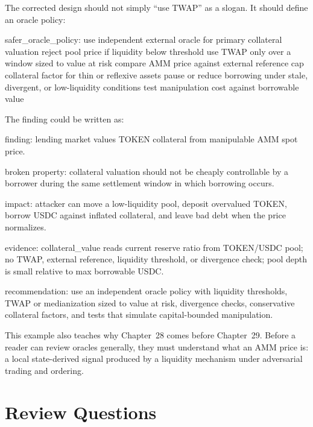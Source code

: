 The corrected design should not simply ``use TWAP'' as a slogan. It should define an oracle policy:

\begin{codeblock}
safer_oracle_policy:
    use independent external oracle for primary collateral valuation
    reject pool price if liquidity below threshold
    use TWAP only over a window sized to value at risk
    compare AMM price against external reference
    cap collateral factor for thin or reflexive assets
    pause or reduce borrowing under stale, divergent, or low-liquidity conditions
    test manipulation cost against borrowable value
\end{codeblock}

The finding could be written as:

\begin{codeblock}
finding:
    lending market values TOKEN collateral from manipulable AMM spot price.

broken property:
    collateral valuation should not be cheaply controllable by a borrower
    during the same settlement window in which borrowing occurs.

impact:
    attacker can move a low-liquidity pool, deposit overvalued TOKEN,
    borrow USDC against inflated collateral, and leave bad debt when
    the price normalizes.

evidence:
    collateral_value reads current reserve ratio from TOKEN/USDC pool;
    no TWAP, external reference, liquidity threshold, or divergence check;
    pool depth is small relative to max borrowable USDC.

recommendation:
    use an independent oracle policy with liquidity thresholds, TWAP or
    medianization sized to value at risk, divergence checks, conservative
    collateral factors, and tests that simulate capital-bounded manipulation.
\end{codeblock}

This example also teaches why Chapter~28 comes before Chapter~29. Before a reader can review oracles generally, they must understand what an AMM price is: a local state-derived signal produced by a liquidity mechanism under adversarial trading and ordering.

\section*{Review Questions}

